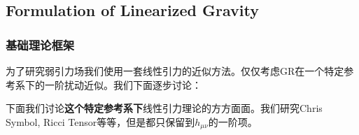 \subsection{Formulation of Linearized Gravity}

\subsubsection{基础理论框架}
为了研究弱引力场我们使用一套线性引力的近似方法。仅仅考虑GR在一个特定参考系下的一阶扰动近似。我们下面逐步讨论：

\bigskip
{}

下面我们讨论\textbf{这个特定参考系下}线性引力理论的方方面面。我们研究Chris Symbol, Ricci
Tensor等等，但是都只保留到$ h_{\mu\nu} $的一阶项。
